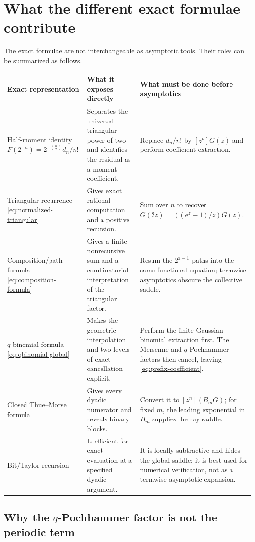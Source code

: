 \documentclass[11pt,oneside]{article}
\theoremstyle{definition}
\theoremstyle{remark}
\newcommand{\e}{\mathrm e}
\begin{document}
\section{What the different exact formulae contribute}
\label{sec:formula-audit}

The exact formulae are not interchangeable as asymptotic tools.  Their roles can be summarized as follows.

\begingroup\small
\begin{longtable}{@{}
>{\raggedright\arraybackslash}p{}
>{\raggedright\arraybackslash}p{}
>{\raggedright\arraybackslash}p{}@{}}
\toprule
Exact representation & What it exposes directly & What must be done before asymptotics\\
\midrule
\endhead
Half-moment identity
$F(2^{-n})=2^{-\binom n2}d_n/n!$
& Separates the universal triangular power of two and identifies the residual as a moment coefficient.
& Replace $d_n/n!$ by $[z^n]G(z)$ and perform coefficient extraction.\\[0.6em]
Triangular recurrence
\eqref{eq:normalized-triangular}
& Gives exact rational computation and a positive recursion.
& Sum over $n$ to recover $G(2z)=((\e^z-1)/z)G(z)$.\\[0.6em]
Composition/path formula
\eqref{eq:composition-formula}
& Gives a finite nonrecursive sum and a combinatorial interpretation of the triangular factor.
& Resum the $2^{n-1}$ paths into the same functional equation; termwise asymptotics obscure the collective saddle.\\[0.6em]
$q$-binomial formula
\eqref{eq:qbinomial-global}
& Makes the geometric interpolation and two levels of exact cancellation explicit.
& Perform the finite Gaussian-binomial extraction first.  The Mersenne and $q$-Pochhammer factors then cancel, leaving \eqref{eq:prefix-coefficient}.\\[0.6em]
Closed Thue--Morse formula
& Gives every dyadic numerator and reveals binary blocks.
& Convert it to $[z^n](B_mG)$; for fixed $m$, the leading exponential in $B_m$ supplies the ray saddle.\\[0.6em]
Bit/Taylor recursion
& Is efficient for exact evaluation at a specified dyadic argument.
& It is locally subtractive and hides the global saddle; it is best used for numerical verification, not as a termwise asymptotic expansion.\\
\bottomrule
\end{longtable}
\endgroup

\subsection{Why the $q$-Pochhammer factor is not the periodic term}
\end{document}
